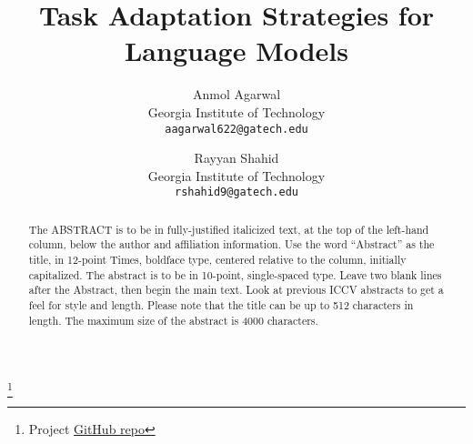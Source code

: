 \documentclass[10pt,twocolumn,letterpaper]{article}
\begin{document}
\title{Task Adaptation Strategies for Language Models}

\author{Anmol Agarwal\\
Georgia Institute of Technology\\
{\tt\small aagarwal622@gatech.edu}
\and
Rayyan Shahid\\
Georgia Institute of Technology\\
{\tt\small rshahid9@gatech.edu}
}

\maketitle




\begin{abstract}
   The ABSTRACT is to be in fully-justified italicized text, at the top
   of the left-hand column, below the author and affiliation
   information. Use the word ``Abstract'' as the title, in 12-point
   Times, boldface type, centered relative to the column, initially
   capitalized. The abstract is to be in 10-point, single-spaced type.
   Leave two blank lines after the Abstract, then begin the main text.
   Look at previous ICCV abstracts to get a feel for style and length.
	 Please note that the title can be up to 512 characters in length.
	 The maximum size of the abstract is 4000 characters.
\end{abstract}

\footnote{Project \href{https://github.com/sicario001/llmft}{GitHub repo}}
\end{document}

